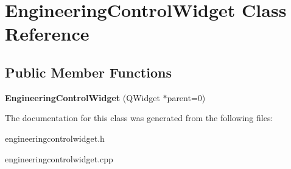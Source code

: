 \hypertarget{classEngineeringControlWidget}{\section{Engineering\-Control\-Widget Class Reference}
\label{classEngineeringControlWidget}
}
\subsection*{Public Member Functions}
\begin{DoxyCompactItemize}
\item 
\hypertarget{classEngineeringControlWidget_a5e164631bef32b7889f89a93b20275cc}{{\bfseries Engineering\-Control\-Widget} (Q\-Widget $\ast$parent=0)}\label{classEngineeringControlWidget_a5e164631bef32b7889f89a93b20275cc}

\end{DoxyCompactItemize}


The documentation for this class was generated from the following files\-:\begin{DoxyCompactItemize}
\item 
engineeringcontrolwidget.\-h\item 
engineeringcontrolwidget.\-cpp\end{DoxyCompactItemize}
